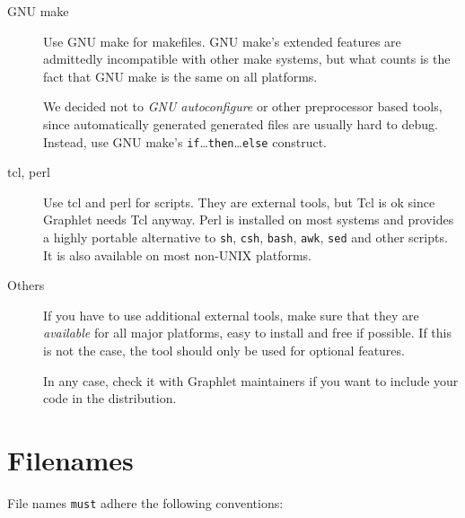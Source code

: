 \begin{description}

  \item[GNU make]
  Use GNU make for makefiles.  GNU make's extended features 
  are admittedly incompatible with other make systems, but what counts 
  is the fact that GNU make is the same on all platforms.
  
  We decided not to \emph{GNU autoconfigure} or other
  preprocessor based tools, since automatically generated
  generated files are usually hard to debug.  Instead, use GNU
  make's \texttt{if}\ldots\texttt{then}\ldots\texttt{else}
  construct.
  
  \item[tcl, perl] Use tcl and perl for scripts.  They are
  external tools, but Tcl is ok since Graphlet needs Tcl anyway.
  Perl is installed on most systems and provides a highly
  portable alternative to \texttt{sh}, \texttt{csh},
  \texttt{bash}, \texttt{awk}, \texttt{sed} and other scripts. It
  is also available on most non-UNIX platforms.
  
  \item[Others] If you have to use additional external tools,
  make sure that they are \emph{available} for all major
  platforms, easy to install and free if possible.  If this is
  not the case, the tool should only be used for optional
  features.
  
  In any case, check it with Graphlet maintainers if you want to
  include your code in the distribution.

\end{description}



%
%

\section{Filenames}

File names \texttt{must} adhere the following conventions:

